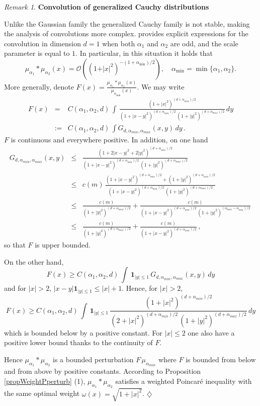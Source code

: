 \documentclass[11pt,reqno]{amsart}
\numberwithin{equation}{section}
\theoremstyle{definition}
\theoremstyle{remark}
\newtheorem{remark}[theorem]{Remark}
\begin{document}
\begin{remark}\textbf{Convolution of generalized Cauchy distributions}

Unlike the Gaussian family the generalized Cauchy family is not stable, making the analysis of convolutions more complex. \cite{NAD} provides explicit expressions for the convolution in dimension $d=1$ when both $\alpha_1$ and $\alpha_2$ are odd, and the scale parameter is equal to $1$. In particular, in this situation it holds that
    $$
    \mu_{\alpha_1}*\mu_{\alpha_2}(x) = \mathcal{O}\left((1+\vert x\vert^2)^{-{(1+\alpha_{\min})/2}}\right), \quad \alpha_{\min}=\min\{\alpha_1, \alpha_2\}.
    $$
More generally, denote $F(x)= \frac{\mu_{\alpha_1}*\mu_{\alpha_2}(x)}{\mu_{\alpha_{\min}}(x)}$. We may write 
\begin{eqnarray*}
F(x) &=& C(\alpha_1,\alpha_2,d) \, \int \, \frac{(1+|x|^2)^{(d+\alpha_{min})/2}}{(1+|x-y|^2)^{(d+\alpha_{min})/2} \, (1+|y|^2)^{(d+\alpha_{max})/2}} \, dy \\ &:=& C(\alpha_1,\alpha_2,d) \, \int G_{d,\alpha_{min},\alpha_{max}}(x,y) \, dy \, .
\end{eqnarray*}
$F$ is continuous and everywhere positive. In addition, on one hand 
\begin{eqnarray*}
G_{d,\alpha_{min},\alpha_{max}}(x,y) &\leq & \frac{(1+2|x-y|^2+2|y|^2)^{(d+\alpha_{min})/2}}{(1+|x-y|^2)^{(d+\alpha_{min})/2} \, (1+|y|^2)^{(d+\alpha_{max})/2}}\\ &\leq& c(m) \, \frac{(1+|x-y|^2)^{(d+\alpha_{min})/2} + (1+|y|^2)^{(d+\alpha_{min})/2}}{(1+|x-y|^2)^{(d+\alpha_{min})/2} \, (1+|y|^2)^{(d+\alpha_{max})/2}}\\ &\leq& \frac{c(m)}{(1+|y|^2)^{(d+\alpha_{max})/2}} + \frac{c(m)}{(1+|x-y|^2)^{(d+\alpha_{min})/2} \, (1+|y|^2)^{(\alpha_{max}-\alpha_{min})/2}} \, \\ &\leq& \frac{c(m)}{(1+|y|^2)^{(d+\alpha_{max})/2}} + \frac{c(m)}{(1+|x-y|^2)^{(d+\alpha_{min})/2}} \, ,
\end{eqnarray*}
so that $F$ is upper bounded. 

On the other hand, $$F(x) \geq C(\alpha_1,\alpha_2,d) \, \int \, \mathbf 1_{|y|\leq 1} \, G_{d,\alpha_{min},\alpha_{max}}(x,y) \, dy$$ and for $|x|>2$, $|x-y| \mathbf 1_{|y|\leq 1} \leq |x|+1$. Hence, for $|x|>2$, 
$$F(x) \geq C(\alpha_1,\alpha_2,d) \, \int\, \mathbf 1_{|y|\leq 1} \, \frac{(1+|x|^2)^{(d+\alpha_{min})/2}}{(2+|x|^2)^{(d+\alpha_{min})/2} \, (1+|y|^2)^{(d+\alpha_{max})/2}} \, dy$$ which is bounded below by a positive constant. For $|x|\leq 2$ one also have a positive lower bound thanks to the continuity of $F$.

Hence $\mu_{\alpha_1}*\mu_{\alpha_2}$ is a bounded perturbation $F \, \mu_{\alpha_{min}}$ where $F$ is bounded from below and from above by positive constants. According to Proposition \ref{propWeightPperturb} (1), $\mu_{\alpha_1}*\mu_{\alpha_2}$ satisfies a weighted Poincar\'e inequality with the same optimal weight $\omega(x)=\sqrt{1+|x|^2}$.
\hfill $\diamondsuit$
\end{remark}
\end{document}
